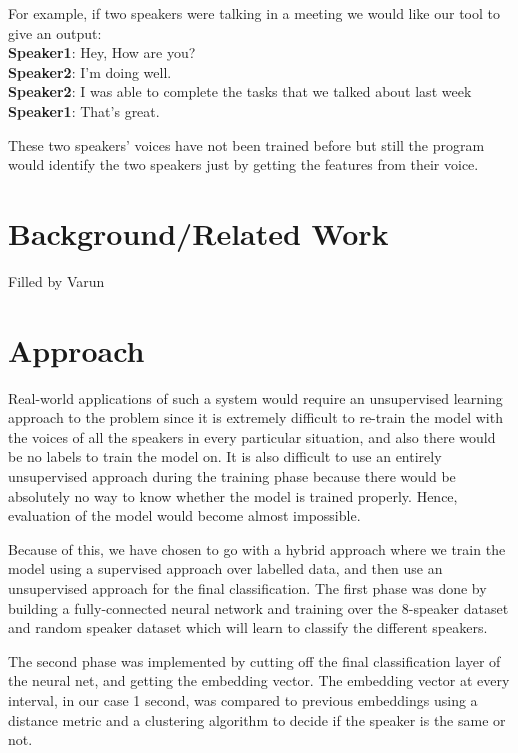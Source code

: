 \documentclass[10pt,twocolumn,letterpaper]{article}
\begin{document}
For example, if two speakers were talking in a meeting we would like our tool to give an output: 
\\  {\bf Speaker1}: Hey, How are you? 
\\ {\bf Speaker2}: I’m doing well.
\\ {\bf Speaker2}: I was able to complete the tasks that we talked about last week
\\ {\bf Speaker1}: That’s great.

These two speakers’ voices have not been trained before but still the program would identify the two speakers just by getting the features from their voice. 

\section{Background/Related Work}

Filled by Varun


\section{Approach}

Real-world applications of such a system would require an unsupervised learning approach to the problem since it is extremely difficult to re-train the model with the voices of all the speakers in every particular situation, and also there would be no labels to train the model on. It is also difficult to use an entirely unsupervised approach during the training phase because there would be absolutely no way to know whether the model is trained properly. Hence, evaluation of the model would become almost impossible.

Because of this, we have chosen to go with a hybrid approach where we train the model using a supervised approach over labelled data, and then use an unsupervised approach for the final classification. The first phase was done by building a fully-connected neural network and training over the 8-speaker dataset and random speaker dataset which will learn to classify the different speakers. 

The second phase was implemented by cutting off the final classification layer of the neural net, and getting the embedding vector. The embedding vector at every interval, in our case 1 second, was compared to previous embeddings using a distance metric and a clustering algorithm  to decide if the speaker is the same or not.
\end{document}
